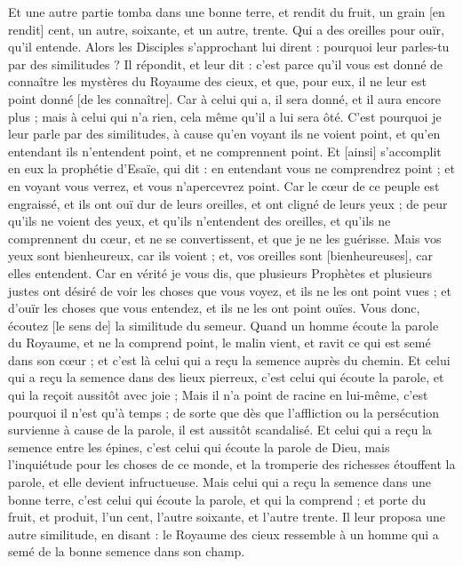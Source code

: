 \begin{multicols}{2}
Et une autre partie tomba dans une bonne terre, et rendit du fruit, un grain [en rendit] cent, un autre, soixante, et un autre, trente.
Qui a des oreilles pour ouïr, qu'il entende.
Alors les Disciples s'approchant lui dirent : pourquoi leur parles-tu par des similitudes ?
Il répondit, et leur dit : c'est parce qu'il vous est donné de connaître les mystères du Royaume des cieux, et que, pour eux, il ne leur est point donné [de les connaître].
Car à celui qui a, il sera donné, et il aura encore plus ; mais à celui qui n'a rien, cela même qu'il a lui sera ôté.
C'est pourquoi je leur parle par des similitudes, à cause qu'en voyant ils ne voient point, et qu'en entendant ils n'entendent point, et ne comprennent point.
Et [ainsi] s'accomplit en eux la prophétie d'Esaïe, qui dit : en entendant vous ne comprendrez point ; et en voyant vous verrez, et vous n'apercevrez point.
Car le cœur de ce peuple est engraissé, et ils ont ouï dur de leurs oreilles, et ont cligné de leurs yeux ; de peur qu'ils ne voient des yeux, et qu'ils n'entendent des oreilles, et qu'ils ne comprennent du cœur, et ne se convertissent, et que je ne les guérisse.
Mais vos yeux sont bienheureux, car ils voient ; et, vos oreilles sont [bienheureuses], car elles entendent.
Car en vérité je vous dis, que plusieurs Prophètes et plusieurs justes ont désiré de voir les choses que vous voyez, et ils ne les ont point vues ; et d'ouïr les choses que vous entendez, et ils ne les ont point ouïes.
Vous donc, écoutez [le sens de] la similitude du semeur.
Quand un homme écoute la parole du Royaume, et ne la comprend point, le malin vient, et ravit ce qui est semé dans son cœur ; et c'est là celui qui a reçu la semence auprès du chemin.
Et celui qui a reçu la semence dans des lieux pierreux, c'est celui qui écoute la parole, et qui la reçoit aussitôt avec joie ;
Mais il n'a point de racine en lui-même, c'est pourquoi il n'est qu'à temps ; de sorte que dès que l'affliction ou la persécution survienne à cause de la parole, il est aussitôt scandalisé.
Et celui qui a reçu la semence entre les épines, c'est celui qui écoute la parole de Dieu, mais l'inquiétude pour les choses de ce monde, et la tromperie des richesses étouffent la parole, et elle devient infructueuse.
Mais celui qui a reçu la semence dans une bonne terre, c'est celui qui écoute la parole, et qui la comprend ; et porte du fruit, et produit, l'un cent, l'autre soixante, et l'autre trente.
Il leur proposa une autre similitude, en disant : le Royaume des cieux ressemble à un homme qui a semé de la bonne semence dans son champ.

\end{multicols}
